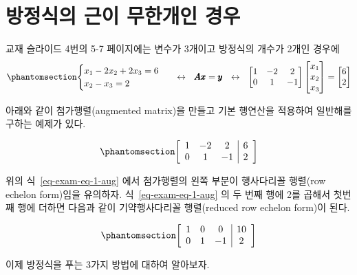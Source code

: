 \documentclass[
  11pt,
  a4paper,
  oneside]{scrbook}
\theoremstyle{definition}
\theoremstyle{definition}
\theoremstyle{plain}
\theoremstyle{remark}
\begin{document}
\section{방정식의 근이 무한개인
경우}\label{uxbc29uxc815uxc2dduxc758-uxadfcuxc774-uxbb34uxd55cuxac1cuxc778-uxacbduxc6b0}

교재 슬라이드 4번의 5-7 페이지에는 변수가 3개이고 방정식의 개수가 2개인
경우에 \begin{equation}\phantomsection\label{eq-exam-eq-1}{
\begin{cases}
x_1 - 2 x_2 + 2 x_3 = 6 \\
x_2 -x_3 =2 
\end{cases}
~~\leftrightarrow~~
\pmb A \pmb x = \pmb y
~~\leftrightarrow~~
\begin{bmatrix}
1 & -2 & 2 \\
0 & 1  & -1 
\end{bmatrix}
\begin{bmatrix}
x_1 \\
x_2 \\
x_3 \end{bmatrix}
=
\begin{bmatrix}
6 \\
2
\end{bmatrix}
}\end{equation}

아래와 같이 첨가행렬(augmented matrix)을 만들고 기본 행연산을 적용하여
일반해를 구하는 예제가 있다.

\begin{equation}\phantomsection\label{eq-exam-eq-1-aug}{
\left[\begin{array}{ccc|c}
1 & -2 & 2 & 6\\
0 & 1  & -1 & 2
\end{array}\right]
}\end{equation}

위의 식~\ref{eq-exam-eq-1-aug} 에서 첨가행렬의 왼쪽 부분이 행사다리꼴
행렬(row echelon form)임을 유의하자. 식~\ref{eq-exam-eq-1-aug} 의 두
번째 행에 2를 곱해서 첫번 째 행에 더하면 다음과 같이 기약행사다리꼴
행렬(reduced row echelon form)이 된다.

\begin{equation}\phantomsection\label{eq-exam-eq-1-aug2}{
\left[\begin{array}{ccc|c}
1 & 0 & 0 & 10\\
0 & 1  & -1 & 2
\end{array}\right]
}\end{equation}

이제 방정식을 푸는 3가지 방법에 대하여 알아보자.
\end{document}
